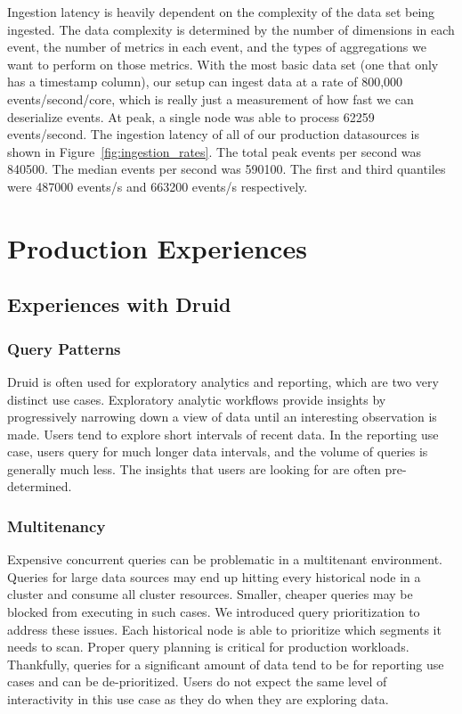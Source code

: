 \documentclass{vldb}
\begin{document}
Ingestion latency is heavily dependent on the complexity of the data set being
ingested. The data complexity is determined by the number of dimensions in each
event, the number of metrics in each event, and the types of aggregations we
want to perform on those metrics. With the most basic data set (one that only
has a timestamp column), our setup can ingest data at a rate of 800,000
events/second/core, which is really just a measurement of how fast we can
deserialize events. At peak, a single node was able to process 62259
events/second. The ingestion latency of all of our production datasources is
shown in Figure~\ref{fig:ingestion_rates}. The total peak events per second was
840500. The median events per second was 590100. The first and third quantiles
were 487000 events/s and 663200 events/s respectively. 

\section{Production Experiences}
\label{sec:experiences}

\subsection{Experiences with Druid}
\subsubsection{Query Patterns}
Druid is often used for exploratory analytics and reporting, which are two very
distinct use cases. Exploratory analytic workflows provide insights by
progressively narrowing down a view of data until an interesting observation is
made. Users tend to explore short intervals of recent data. In the reporting
use case, users query for much longer data intervals, and the volume of queries
is generally much less. The insights that users are looking for are often
pre-determined. 

\subsubsection{Multitenancy}
Expensive concurrent queries can be problematic in a multitenant environment.
Queries for large data sources may end up hitting every historical node in a
cluster and consume all cluster resources. Smaller, cheaper queries may be
blocked from executing in such cases. We introduced query prioritization to
address these issues. Each historical node is able to prioritize which segments
it needs to scan. Proper query planning is critical for production workloads.
Thankfully, queries for a significant amount of data tend to be for reporting
use cases and can be de-prioritized. Users do not expect the same level of
interactivity in this use case as they do when they are exploring data. 
\end{document}

